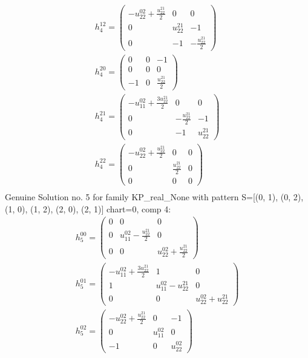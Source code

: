 \documentclass[a4paper, 11pt, twoside, onecolumn]{article}
\begin{document}
\begin{landscape}
\begin{gather*}
	 h_{4}^{12}=\begin{pmatrix}- u^{02}_{22} + \frac{u^{21}_{22}}{2} & 0 & 0\\0 & u^{21}_{22} & -1\\0 & -1 & - \frac{u^{21}_{22}}{2}\end{pmatrix}\\ 
	 h_{4}^{20}=\begin{pmatrix}0 & 0 & -1\\0 & 0 & 0\\-1 & 0 & \frac{u^{21}_{22}}{2}\end{pmatrix}\\ 
	 h_{4}^{21}=\begin{pmatrix}- u^{02}_{11} + \frac{3 u^{21}_{22}}{2} & 0 & 0\\0 & - \frac{u^{21}_{22}}{2} & -1\\0 & -1 & u^{21}_{22}\end{pmatrix}\\ 
	 h_{4}^{22}=\begin{pmatrix}- u^{02}_{22} + \frac{u^{21}_{22}}{2} & 0 & 0\\0 & \frac{u^{21}_{22}}{2} & 0\\0 & 0 & 0\end{pmatrix}\\ 
\end{gather*} 
Genuine Solution no. 5 for family KP_real_None with pattern S=[(0, 1), (0, 2), (1, 0), (1, 2), (2, 0), (2, 1)] chart=0, comp 4: 
\begin{gather*} 
	 h_{5}^{00}=\begin{pmatrix}0 & 0 & 0\\0 & u^{02}_{11} - \frac{u^{21}_{22}}{2} & 0\\0 & 0 & u^{02}_{22} + \frac{u^{21}_{22}}{2}\end{pmatrix}\\ 
	 h_{5}^{01}=\begin{pmatrix}- u^{02}_{11} + \frac{3 u^{21}_{22}}{2} & 1 & 0\\1 & u^{02}_{11} - u^{21}_{22} & 0\\0 & 0 & u^{02}_{22} + u^{21}_{22}\end{pmatrix}\\ 
	 h_{5}^{02}=\begin{pmatrix}- u^{02}_{22} + \frac{u^{21}_{22}}{2} & 0 & -1\\0 & u^{02}_{11} & 0\\-1 & 0 & u^{02}_{22}\end{pmatrix}\\ 

\end{gather*}
\end{landscape}
\end{document}
